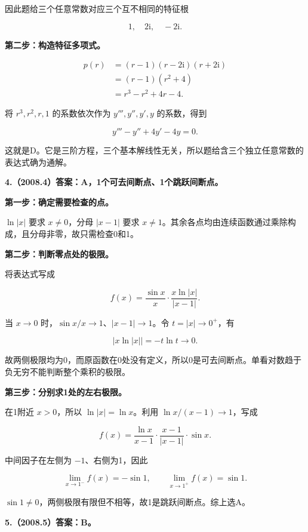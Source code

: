 \documentclass[UTF8,11pt,fontset=windows]{ctexart}
\begin{document}
因此题给三个任意常数对应三个互不相同的特征根

$$
1,\quad 2\mathrm i,\quad-2\mathrm i.
$$

\textbf{第二步：构造特征多项式。}

$$
\begin{aligned}
p(r)&=(r-1)(r-2\mathrm i)(r+2\mathrm i)\\
&=(r-1)(r^2+4)\\
&=r^3-r^2+4r-4.
\end{aligned}
$$

将 $r^3,r^2,r,1$ 的系数依次作为 $y''',y'',y',y$ 的系数，得到

$$
\boxed{y'''-y''+4y'-4y=0}.
$$

这就是D。它是三阶方程，三个基本解线性无关，所以题给含三个独立任意常数的表达式确为通解。

\clearpage

\textbf{4.（2008.4）答案：A，1个可去间断点、1个跳跃间断点。}

\textbf{第一步：确定需要检查的点。}

$\ln|x|$ 要求 $x\ne0$，分母 $|x-1|$ 要求 $x\ne1$。其余各点均由连续函数通过乘除构成，且分母非零，故只需检查0和1。

\textbf{第二步：判断零点处的极限。}

将表达式写成

$$
f(x)=\frac{\sin x}{x}\cdot
\frac{x\ln|x|}{|x-1|}.
$$

当 $x\to0$ 时，$\sin x/x\to1$、$|x-1|\to1$。令 $t=|x|\to0^+$，有

$$
|x\ln|x||=-t\ln t\longrightarrow0.
$$

故两侧极限均为0，而原函数在0处没有定义，所以0是可去间断点。单看对数趋于负无穷不能判断整个乘积的极限。

\textbf{第三步：分别求1处的左右极限。}

在1附近 $x>0$，所以 $\ln|x|=\ln x$。利用 $\ln x/(x-1)\to1$，写成

$$
f(x)=\frac{\ln x}{x-1}\cdot\frac{x-1}{|x-1|}\cdot\sin x.
$$

中间因子在左侧为 $-1$、右侧为1，因此

$$
\lim_{x\to1^-}f(x)=-\sin1,
\qquad\lim_{x\to1^+}f(x)=\sin1.
$$

$\sin1\ne0$，两侧极限有限但不相等，故1是跳跃间断点。综上选A。

\clearpage

\textbf{5.（2008.5）答案：B。}
\end{document}
